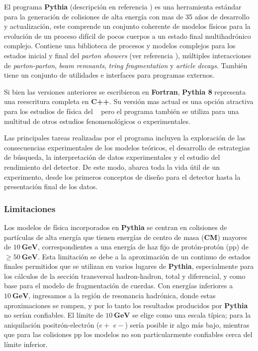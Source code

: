 
El programa \textbf{Pythia} (descripción en referencia \cite{sjostrand_introduction_2015}) es una herramienta estándar para la generación de colisiones de alta energía con mas de 35 a\~nos de desarrollo y actualización, este comprende un conjunto coherente de modelos físicos para la evolución de un proceso difícil de pocos cuerpos a un estado final multihadrónico complejo. Contiene una biblioteca de procesos y modelos complejos para los estados inicial y final del \textit{parton showers} (ver referencia \cite{nagy_what_2018}), múltiples interacciones de \textit{parton-parton}, \textit{beam remnants}, \textit{tring fragmentation} y \textit{article decays}. También tiene un conjunto de utilidades e interfaces para programas externos.  

Si bien las versiones anteriores se escribieron en \textbf{Fortran}, \textbf{Pythia 8} representa una reescritura completa en \textbf{C++}. Su versión mas actual es una opción atractiva para los estudios de física del \LHC ~ pero el programa también se utiliza para una multitud de otros estudios fenomenológicos o experimentales.

Las principales tareas realizadas por el programa incluyen la exploración de las consecuencias experimentales de los modelos teóricos, el desarrollo de estrategias de búsqueda, la interpretación de datos experimentales y el estudio del rendimiento del detector. De este modo, abarca toda la vida útil de un experimento, desde los primeros conceptos de diseño para el detector hasta la presentación final de los datos. %

\subsubsection{Limitaciones}

Los modelos de física incorporados en \textbf{Pythia} se centran en colisiones de partículas de alta energía que tienen energías de centro de masa (\textbf{CM}) mayores de $10 ~ \mathbf{GeV}$, correspondientes a una energía de haz fijo de protón-protón (pp) de $\geq 50~\mathbf{GeV}$. Esta limitación se debe a la aproximación de un continuo de estados finales permitidos que se utilizan en varios lugares de \textbf{Pythia}, especialmente para los cálculos de la sección transversal hadron-hadron, total y diferencial, y como base para el modelo de fragmentación de cuerdas. Con energías inferiores a $10 ~ \mathbf{GeV}$, ingresamos a la región de resonancia hadrónica, donde estas aproximaciones se rompen, y por lo tanto los resultados producidos por \textbf{Pythia} no serían confiables. El límite de $10~\mathbf{GeV}$ se elige como una escala típica; para la aniquilación positrón-electrón ($e+$ $e-$) sería posible ir algo más bajo, mientras que para las colisiones pp los modelos no son particularmente confiables cerca del límite inferior.


